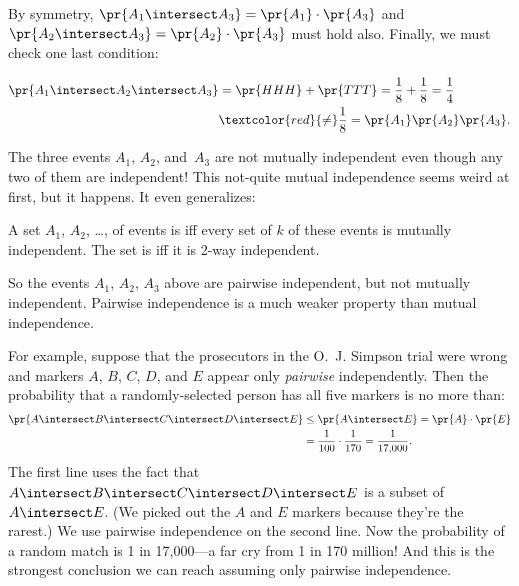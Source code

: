 By symmetry, $\pr{A_1 \intersect A_3} = \pr{A_1} \cdot \pr{A_3}$ and
$\pr{A_2 \intersect A_3} = \pr{A_2} \cdot \pr{A_3}$ must hold also.
Finally, we must check one last condition:

\begin{align*}
\pr{A_1 \intersect A_2 \intersect A_3}
        & = \pr{HHH} + \pr{TTT}
          = \frac{1}{8} + \frac{1}{8}
          = \frac{1}{4}\\
        & \textcolor{red}{\mathbf{\neq}} \frac{1}{8} = \pr{A_1} \pr{A_2} \pr{A_3}.
\end{align*}


\iffalse
\begin{align*}
\pr{A_1 \intersect A_2 \intersect A_3}      & = \pr{HHH} + \pr{TTT} \\[2pt]
                                & = \frac{1}{8} + \frac{1}{8} \\[2pt]
                                & = \frac{1}{4} \\[2pt]
                                & \neq \pr{A_1} \pr{A_2} \pr{A_3} = \frac{1}{8}.
\end{align*}
\fi
%
The three events $A_1$, $A_2$, and~$A_3$ are not mutually independent
even though any two of them are independent!  This not-quite mutual
independence seems weird at first, but it happens.  It even
generalizes:

\begin{definition}\label{kway_independent_events}
  A set $A_1$, $A_2$, \dots, of events is 
  iff every set of $k$ of these events is mutually independent.  The
  set is  iff it is 2-way independent.
\end{definition}

So the events $A_1$, $A_2$, $A_3$ above are pairwise independent, but
not mutually independent.  Pairwise independence is a much weaker
property than mutual independence.

For example, suppose that the prosecutors in the O.~J. Simpson trial
were wrong and markers $A$, $B$, $C$, $D$, and $E$ appear only
\emph{pairwise} independently.  Then the probability that a
randomly-selected person has all five markers is no more than:
%
\begin{align*}
\pr{A \intersect B \intersect C \intersect D \intersect E}
    & \leq \pr{A \intersect E} = \pr{A} \cdot \pr{E}\\
    & = \frac{1}{100} \cdot \frac{1}{170} = \frac{1}{17{,}000}.
\end{align*}
%
The first line uses the fact that $A \intersect B \intersect C \intersect
D \intersect E$ is a subset of $A \intersect E$.  (We picked out the $A$
and $E$ markers because they're the rarest.)  We use pairwise independence
on the second line.  Now the probability of a random match is 1 in
17,000---a far cry from 1 in 170 million!  And this is the strongest
conclusion we can reach assuming only pairwise independence.


